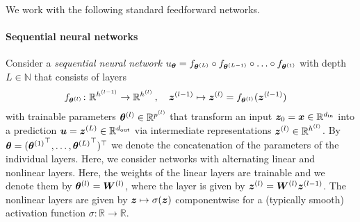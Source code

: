 We work with the following standard feedforward networks.

\paragraph{Sequential neural networks} Consider a \emph{sequential neural network} $%
u_{\vtheta} = f_{\vtheta^{(L)}} \circ f_{\vtheta^{(L-1)}} \circ \ldots \circ f_{\vtheta^{(1)}}
$ with depth $L\in\mathbb N$ that consists of layers %
\begin{align}
  \begin{split}
    f%
    _{\vtheta^{(l)}}\colon \sR^{h^{(l-1)}}
    &\to
      \sR^{h^{(l)}}\,,
    \quad \vz^{(l-1)}
    \mapsto
      \vz^{(l)} = f%
      _{\vtheta^{(l)}}(\vz^{(l-1)})
  \end{split}
\end{align}
with trainable parameters $\vtheta^{(l)} \in \sR^{p^{(l)}}%
$ that transform an input ${\bm{z}}_0={\bm{x}} \in \mathbb R^{d_{\operatorname{in}}}$ into a prediction ${\bm{u}} = {\bm{z}}^{(L)}\in {\mathbb{R}}^{d_{\operatorname{out}}}$ via intermediate representations $\vz^{(l)} \in \sR^{h^{(l)}}%
$.
By ${\bm{\theta}} = ({{\bm{\theta}}^{(1)}}^{\top}, \dots, {{\bm{\theta}}^{(L)}}^{\top})^{\top}$ we denote the concatenation of the parameters of the individual layers.
Here, we consider networks with alternating  linear and nonlinear layers.
Here, the weights of the linear layers are trainable and we denote them by ${\bm{\theta}}^{(l)} = {\bm{W}}^{(l)}$, where the layer is given by ${\bm{z}}^{(l)} = {\bm{W}}^{(l)} {\bm{z}}^{(l-1)}$.
The nonlinear layers are given by ${\bm{z}}\mapsto \sigma({\bm{z}})$ componentwise for a (typically smooth) activation function $\sigma\colon\mathbb R\to\mathbb R$.

